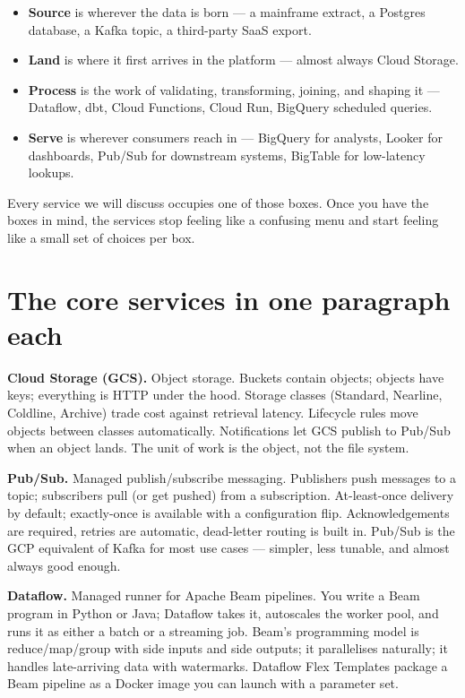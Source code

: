 \documentclass[
  11pt,
  british,
  oneside]{book}
\providecommand{\tightlist}{%
  \setlength{\itemsep}{0pt}\setlength{\parskip}{0pt}}
\begin{document}
\begin{itemize}
\tightlist
\item
  \textbf{Source} is wherever the data is born --- a mainframe extract,
  a Postgres database, a Kafka topic, a third-party SaaS export.
\item
  \textbf{Land} is where it first arrives in the platform --- almost
  always Cloud Storage.
\item
  \textbf{Process} is the work of validating, transforming, joining, and
  shaping it --- Dataflow, dbt, Cloud Functions, Cloud Run, BigQuery
  scheduled queries.
\item
  \textbf{Serve} is wherever consumers reach in --- BigQuery for
  analysts, Looker for dashboards, Pub/Sub for downstream systems,
  BigTable for low-latency lookups.
\end{itemize}

Every service we will discuss occupies one of those boxes. Once you have
the boxes in mind, the services stop feeling like a confusing menu and
start feeling like a small set of choices per box.

\hypertarget{the-core-services-in-one-paragraph-each}{%
\section{The core services in one paragraph
each}\label{the-core-services-in-one-paragraph-each}}

\textbf{Cloud Storage (GCS).} Object storage.
Buckets contain objects; objects have keys; everything is HTTP under the
hood. Storage classes (Standard, Nearline, Coldline, Archive) trade cost
against retrieval latency. Lifecycle
rules move objects between classes
automatically. Notifications let GCS
publish to Pub/Sub when an object lands. The unit of work is the object,
not the file system.

\textbf{Pub/Sub.} Managed publish/subscribe messaging.
Publishers push messages to a topic; subscribers
pull (or get pushed) from a subscription.
At-least-once delivery by default; exactly-once is available with a
configuration flip. Acknowledgements are required, retries are
automatic, dead-letter routing is built in.
Pub/Sub is the GCP equivalent of Kafka for most use cases --- simpler,
less tunable, and almost always good enough.

\textbf{Dataflow.} Managed runner for Apache
Beam pipelines. You write a Beam program in Python or
Java; Dataflow takes it, autoscales the
worker pool, and runs it as either a batch or a streaming job. Beam's
programming model is reduce/map/group with side inputs and side outputs;
it parallelises naturally; it handles late-arriving data with
watermarks. Dataflow Flex Templates
package a Beam pipeline as a Docker image you can launch with a
parameter set.
\end{document}
